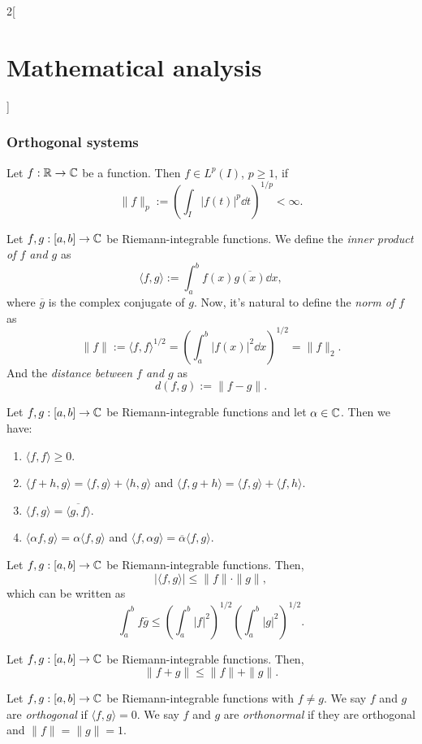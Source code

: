 \documentclass[../../../main.tex]{subfiles}
\begin{document}
\begin{multicols}{2}[\section{Mathematical analysis}]
\subsubsection*{Orthogonal systems}
\begin{definition}
Let $f:\mathbb{R} \rightarrow\mathbb{C} $ be a function. Then $f\in L^p(I)$, $p\geq1$, if $$\|f\|_p:=\left(\int_I|f(t)|^p\dd t\right)^{1/p}<\infty.$$ 
\end{definition}
\begin{definition}
Let $f,g:[a,b]\rightarrow\mathbb{C} $ be Riemann-integrable functions. We define the \textit{inner product of $f$ and $g$} as $$\langle f,g\rangle:=\int_a^bf(x)\overline{g(x)}\dd x,$$ where $\overline{g}$ is the complex conjugate of $g$. Now, it's natural to define the \textit{norm of $f$} as $$\|f\|:=\langle f,f\rangle^{1/2}=\left(\int_a^b|f(x)|^2\dd x\right)^{1/2}=\|f\|_2.$$ And the \textit{distance between $f$ and $g$} as $$d(f,g):=\|f-g\|.$$
\end{definition}
\begin{prop}
Let $f,g:[a,b]\rightarrow\mathbb{C} $ be Riemann-integrable functions and let $\alpha\in\mathbb{C} $. Then we have:
\begin{enumerate}
    \item $\langle f,f\rangle\geq 0$.
    \item $\langle f+h,g\rangle=\langle f,g\rangle+\langle h,g\rangle$ and $\langle f,g+h\rangle=\langle f,g\rangle+\langle f,h\rangle$.
    \item $\langle f,g\rangle=\overline{\langle g,f\rangle}$.
    \item $\langle \alpha f,g\rangle=\alpha\langle f,g\rangle$ and $\langle f,\alpha g\rangle=\overline{\alpha}\langle f,g\rangle$.
\end{enumerate}
\end{prop}
\begin{theorem}
Let $f,g:[a,b]\rightarrow\mathbb{C} $ be Riemann-integrable functions. Then, $$|\langle f,g\rangle|\leq\|f\|\cdot\|g\|,$$ which can be written as $$\int_a^bf\overline{g}\leq\left(\int_a^b|f|^2\right)^{1/2}\left(\int_a^b|g|^2\right)^{1/2}.$$
\end{theorem}
\begin{theorem}
Let $f,g:[a,b]\rightarrow\mathbb{C} $ be Riemann-integrable functions. Then, $$\| f+g\|\leq\|f\|+\|g\|.$$
\end{theorem}
\begin{definition}
Let $f,g:[a,b]\rightarrow\mathbb{C} $ be Riemann-integrable functions with $f\ne g$. We say $f$ and $g$ are \textit{orthogonal} if $\langle f,g\rangle=0$. We say $f$ and $g$ are \textit{orthonormal} if they are orthogonal and $\|f\|=\|g\|=1$.

\end{definition}
\end{multicols}
\end{document}
